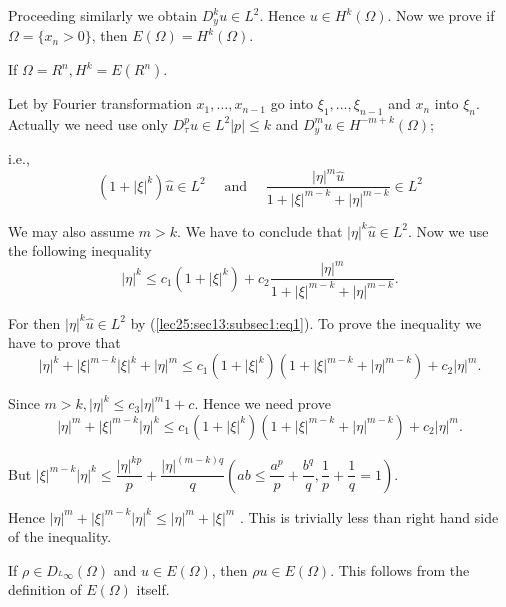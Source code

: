 Proceeding similarly we obtain $D^k_y u \in L^2$. Hence $u
\in H^k (\Omega)$. Now we prove if $\Omega = \{ x_n > 0 \}$,
then $E(\Omega) = H^k (\Omega)$. 

\begin{lemma}\label{lec25:sec13:subsec1:lem13.2}%
  If $\Omega = R^n, H^k = E(R^n)$.
\end{lemma}

Let by Fourier transformation $x_1, \ldots, x_{n-1}$ go into $\xi_1,
\ldots, \xi_{n-1}$ and $x_n$ into $\xi_n$. Actually we need use only
$D^p_\tau u \in L^2 |p| \le k$ and $D^m_y u \in H^{-m + k}(\Omega)$; 

i.e.,
\begin{equation*}
  (1 + | \xi |^k ) \hat{u} \in L^2 \quad \text{ and } \quad \frac{| 
    \eta |^m \hat{u}}{1 + | \xi |^{m - k} + | \eta |^{m - k}} \in L^2 \tag{1}\label{lec25:sec13:subsec1:lem13.2:eq1} 
\end{equation*}

We may also assume $m > k$. We have to conclude that $|\eta|^k \hat{u}
\in L^2$. Now we use the following inequality 
$$
|\eta|^k \leq c_1 (1 + |\xi|^k) + c_2 \frac{|\eta|^m}{1 + |\xi
  |^{m -k} + |\eta|^{m-k}}. 
$$

For then $|\eta|^k \hat{u} \in L^2$ by (\ref{lec25:sec13:subsec1:eq1}). To prove the inequality we have to prove that
$$
|\eta|^k + |\xi|^{m-k} |\xi|^k + |\eta|^m \le c_1 (1 + |\xi|^k) (1
+ |\xi|^{m-k}+ |\eta|^{m-k}) + c_2 |\eta|^m.
$$ 

Since $m > k, |\eta|^{k } \le c_3 |\eta|^m 1+c$. Hence we need prove
$$
|\eta|^m + |\xi|^{m-k} |\eta|^k \le c_1 (1+|\xi|^k)(1+ |\xi|^{m-k} +
|\eta|^{m-k}) + c_2 | \eta|^m. 
$$

But $|\xi|^{m-k} |\eta|^k \le \dfrac{|\eta|^{kp}}{p} +
\dfrac{|\eta|^{( m -k )q}}{q} \left(ab \le \dfrac{a^p}{p} + \dfrac{b^q}{q},
\dfrac{1}{p} + \dfrac{1}{q} = 1\right)$. 

Hence $|\eta|^m + |\xi|^{m - k} |\eta|^k \le |\eta|^m + |\xi|^m$
. This is trivially less than right hand side of the inequality. 

\begin{lemma}\label{lec25:sec13:subsec1:lem13.3}%
  If $\rho \in D_{^L\infty}(\Omega)$ and $u \in E (\Omega)$,
  then $\rho u \in E (\Omega)$. This follows from the definition
  of $E (\Omega) $ itself. 
\end{lemma}

